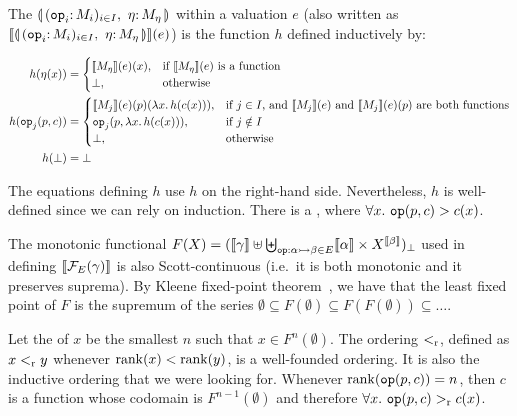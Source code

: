 \begin{definition}
  The  $\cibanana$ within a valuation
  $e$ (also written as $\sem{\cibanana}(e)$) is the function $h$ defined
  inductively by:

  \begin{align*}
    h(\eta(x)) &= \begin{cases}
      \llbracket M_\eta \rrbracket(e)(x), & \text{if $\llbracket M_\eta \rrbracket(e)$ is a function} \\
      \bot, & \text{otherwise} \\
    \end{cases} \\
    h(\mathtt{op}_j(p, c)) &= \begin{cases} 
      \llbracket M_j \rrbracket(e)(p)(\lambda x.\, h(c(x))), & \text{if $j \in I$, and $\llbracket M_j \rrbracket(e)$ and $\llbracket M_j \rrbracket(e)(p)$ are both functions} \\
      \mathtt{op}_j(p, \lambda x.\, h(c(x))), & \text{if $j \notin I$} \\
      \bot, & \text{otherwise} \\
    \end{cases} \\
    h(\bot) &= \bot
  \end{align*}
  
  The equations defining $h$ use $h$ on the right-hand side. Nevertheless,
  $h$ is well-defined since we can rely on induction. There is a
  ,
  where $\forall x.\ \mathtt{op}(p, c) > c(x)$.

  The monotonic functional
  $F(X) = (\llbracket \gamma \rrbracket \uplus \biguplus_{\mathtt{op} : \alpha \rightarrowtail \beta \in
    E} \llbracket \alpha \rrbracket \times X^{\llbracket \beta \rrbracket})_\bot$ used in defining
  $\llbracket \mathcal{F}_E(\gamma) \rrbracket$ is also Scott-continuous (i.e.\ it is both
  monotonic and it preserves suprema). By Kleene fixed-point
  theorem~\cite{kleene1952introduction}, we have that the least fixed point
  of $F$ is the supremum of the series
  $\emptyset \subseteq F(\emptyset) \subseteq F(F(\emptyset)) \subseteq
  \ldots$.

  Let the  of $x$ be the smallest $n$ such that
  $x \in F^n(\emptyset)$. The ordering $<_{\mathrm{r}}$, defined as
  $x <_{\mathrm{r}} y$ whenever $\operatorname{rank}(x) < \operatorname{rank}(y)$, is a well-founded
  ordering. It is also the inductive ordering that we were looking
  for. Whenever $\operatorname{rank}(\mathtt{op}(p, c)) = n$, then $c$ is a function whose
  codomain is $F^{n-1}(\emptyset)$ and therefore
  $\forall x.\ \mathtt{op}(p, c) >_{\mathrm{r}} c(x)$.
\end{definition}

